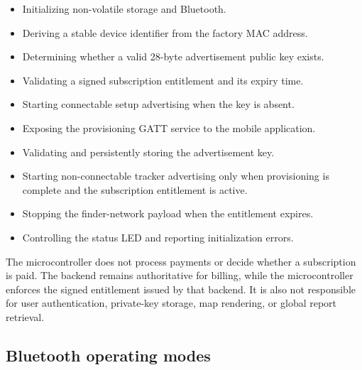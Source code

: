 \documentclass[12pt,a4paper]{article}
\begin{document}
\begin{itemize}
    \item Initializing non-volatile storage and Bluetooth.
    \item Deriving a stable device identifier from the factory MAC address.
    \item Determining whether a valid 28-byte advertisement public key exists.
    \item Validating a signed subscription entitlement and its expiry time.
    \item Starting connectable setup advertising when the key is absent.
    \item Exposing the provisioning GATT service to the mobile application.
    \item Validating and persistently storing the advertisement key.
    \item Starting non-connectable tracker advertising only when provisioning
    is complete and the subscription entitlement is active.
    \item Stopping the finder-network payload when the entitlement expires.
    \item Controlling the status LED and reporting initialization errors.
\end{itemize}

The microcontroller does not process payments or decide whether a subscription
is paid. The backend remains authoritative for billing, while the
microcontroller enforces the signed entitlement issued by that backend. It is
also not responsible for user authentication, private-key storage, map
rendering, or global report retrieval.

\subsection{Bluetooth operating modes}
\end{document}
